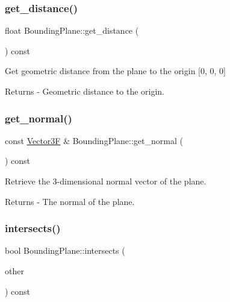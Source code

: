 \subsubsection{\texorpdfstring{get\+\_\+distance()}{get\_distance()}}
{\footnotesize\ttfamily float Bounding\+Plane\+::get\+\_\+distance (\begin{DoxyParamCaption}{ }\end{DoxyParamCaption}) const}

Get geometric distance from the plane to the origin \mbox{[}0, 0, 0\mbox{]} \begin{DoxyReturn}{Returns}
-\/ Geometric distance to the origin. 
\end{DoxyReturn}
\mbox{\label{class_bounding_plane_a7c656534126a09de2768bffe9cdc5964}} 
\subsubsection{\texorpdfstring{get\+\_\+normal()}{get\_normal()}}
{\footnotesize\ttfamily const \mbox{\hyperlink{class_vector3}{Vector3F}} \& Bounding\+Plane\+::get\+\_\+normal (\begin{DoxyParamCaption}{ }\end{DoxyParamCaption}) const}

Retrieve the 3-\/dimensional normal vector of the plane. \begin{DoxyReturn}{Returns}
-\/ The normal of the plane. 
\end{DoxyReturn}
\mbox{\label{class_bounding_plane_af55931eb0667bcfaa91db85abcddc7a6}} 
\subsubsection{\texorpdfstring{intersects()}{intersects()}\hspace{0.1cm}{\footnotesize\ttfamily [1/2]}}
{\footnotesize\ttfamily bool Bounding\+Plane\+::intersects (\begin{DoxyParamCaption}\item[{const \mbox{\hyperlink{class_bounding_sphere}{Bounding\+Sphere}} \&}]{other }\end{DoxyParamCaption}) const}

